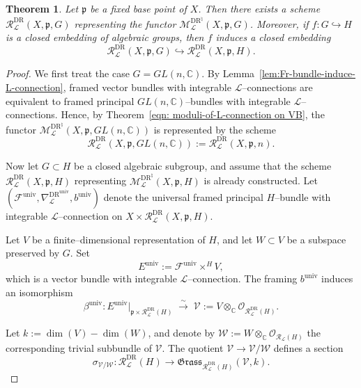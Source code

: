 \documentclass[12pt,reqno]{amsart}
\numberwithin{equation}{subsection}
\newtheorem{thm}[equation]{Theorem}
\theoremstyle{definition}
\theoremstyle{theorem}
\begin{document}
\begin{thm}\label{thm: L-twisted - reprsentaion - space for L-connection}
	Let $\mathfrak{p}$ be a fixed base point of $X$. Then there exists a scheme $\mathcal{R}^{\text{DR}}_{\mathcal{L}}(X,\mathfrak{p},G)$
	representing the functor
	$\mathcal{M}^{\text{DR}^{\natural}}_{\mathcal{L}}(X,\mathfrak{p},G)$.
	Moreover, if $f \colon G \hookrightarrow H$ is a closed embedding of algebraic groups, then $f$ induces a closed embedding
	\[
	\mathcal{R}^{\text{DR}}_{\mathcal{L}}(X,\mathfrak{p},G)
	\hookrightarrow
	\mathcal{R}^{\text{DR}}_{\mathcal{L}}(X,\mathfrak{p},H).
	\]
\end{thm}

\begin{proof}
	We first treat the case $G = GL(n,\mathbb{C})$.
	By Lemma~\eqref{lem:Fr-bundle-induce-L-connection}, framed vector bundles with integrable $\mathcal{L}$--connections are equivalent to  framed principal $GL(n,\mathbb{C})$--bundles with integrable $\mathcal{L}$--connections. Hence, by Theorem~\eqref{eqn: moduli-of-L-connection on VB}, the functor
	$\mathcal{M}^{\text{DR}^{\natural}}_{\mathcal{L}}(X,\mathfrak{p},GL(n,\mathbb{C}))$ is represented by the scheme
	\[
	\mathcal{R}^{\text{DR}}_{\mathcal{L}}(X,\mathfrak{p},GL(n,\mathbb{C}))
	:= \mathcal{R}^{\text{DR}}_{\mathcal{L}}(X,\mathfrak{p},n).
	\]
	
	Now let $G \subset H$ be a closed algebraic subgroup, and assume that the scheme $\mathcal{R}^{\text{DR}}_{\mathcal{L}}(X,\mathfrak{p},H)$ representing
	$\mathcal{M}^{\text{DR}^{\natural}}_{\mathcal{L}}(X,\mathfrak{p},H)$ is already constructed.
	Let $
	(\mathcal{F}^{\mathrm{univ}}, \nabla^{\text{DR}^{\mathrm{univ}}}_{\mathcal{L}},b^{\mathrm{univ}})
	$
	denote the universal framed principal $H$--bundle with integrable
	$\mathcal{L}$--connection on
	$X \times \mathcal{R}^{\text{DR}}_{\mathcal{L}}(X,\mathfrak{p},H)$.
	
	Let $V$ be a finite--dimensional representation of $H$, and let
	$W \subset V$ be a subspace preserved by $G$.
	Set
	\[
	E^{\mathrm{univ}} := \mathcal{F}^{\mathrm{univ}} \times^{H} V,
	\]
	which is a vector bundle with integrable $\mathcal{L}$--connection.
	The framing $b^{\mathrm{univ}}$ induces an isomorphism
	\[
	\beta^{\mathrm{univ}} :
	E^{\mathrm{univ}}|_{\mathfrak{p} \times \mathcal{R}^{\text{DR}}_{\mathcal{L}}(H)}
	\;\xrightarrow{\;\sim\;}\;
	\mathcal{V} := V \otimes_{\mathbb{C}}
	\mathcal{O}_{\mathcal{R}^{\text{DR}}_{\mathcal{L}}(H)}.
	\]
	
	Let $k := \dim(V) - \dim(W)$, and denote by
	$\mathcal{W} := W \otimes_{\mathbb{C}}
	\mathcal{O}_{\mathcal{R}_{\mathcal{L}}(H)}$
	the corresponding trivial subbundle of $\mathcal{V}$.
	The quotient $\mathcal{V} \to \mathcal{V}/\mathcal{W}$ defines a section
	\[
	\sigma_{\mathcal{V}/\mathcal{W}} :
	\mathcal{R}^{\text{DR}}_{\mathcal{L}}(H)
	\longrightarrow
	\mathfrak{Grass}_{\mathcal{R}^{\text{DR}}_{\mathcal{L}}(H)}(\mathcal{V},k).
	\]
	

\end{proof}
\end{document}

